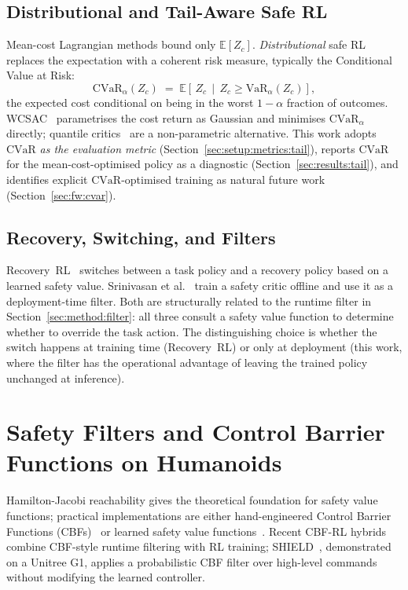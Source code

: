 \documentclass[11pt,a4paper]{report}
\newcommand{\cvar}{\ensuremath{\mathrm{CVaR}}}
\begin{document}
\subsection{Distributional and Tail-Aware Safe RL}
\label{sec:bg:safe:distr}

Mean-cost Lagrangian methods bound only $\mathbb{E}[Z_c]$.
\emph{Distributional} safe RL replaces the expectation with a
coherent risk measure, typically the Conditional Value at Risk:
\begin{equation}
  \cvar_{\alpha}(Z_c) \;=\;
  \mathbb{E}\!\left[\, Z_c \,\middle|\, Z_c \ge \mathrm{VaR}_{\alpha}(Z_c) \right],
  \label{eq:cvar-def}
\end{equation}
the expected cost conditional on being in the worst $1-\alpha$
fraction of outcomes. WCSAC~\cite{yang2021wcsac} parametrises the
cost return as Gaussian and minimises $\cvar_{\alpha}$ directly;
quantile critics~\cite{dabney2018qrdqn} are a non-parametric
alternative. This work adopts \cvar{} \emph{as the evaluation
metric} (Section~\ref{sec:setup:metrics:tail}), reports \cvar{} for
the mean-cost-optimised policy as a diagnostic
(Section~\ref{sec:results:tail}), and identifies explicit
\cvar{}-optimised training as natural future work
(Section~\ref{sec:fw:cvar}).

\subsection{Recovery, Switching, and Filters}
\label{sec:bg:safe:recovery}

Recovery~RL~\cite{thananjeyan2021recovery} switches between a task
policy and a recovery policy based on a learned safety value.
Srinivasan et al.~\cite{srinivasan2020learning} train a safety
critic offline and use it as a deployment-time filter. Both are
structurally related to the runtime filter in
Section~\ref{sec:method:filter}: all three consult a safety value
function to determine whether to override the task action. The
distinguishing choice is whether the switch happens at training
time (Recovery~RL) or only at deployment (this work, where the
filter has the operational advantage of leaving the trained policy
unchanged at inference).

\section{Safety Filters and Control Barrier Functions on Humanoids}
\label{sec:bg:cbf}

Hamilton-Jacobi reachability gives the theoretical foundation for
safety value functions; practical implementations are either
hand-engineered Control Barrier Functions
(CBFs)~\cite{ames2019cbf} or learned safety value
functions~\cite{srinivasan2020learning,thananjeyan2021recovery}.
Recent CBF-RL hybrids~\cite{cbfrl2024} combine CBF-style runtime
filtering with RL training; SHIELD~\cite{shield2025}, demonstrated
on a Unitree G1, applies a probabilistic CBF filter over high-level
commands without modifying the learned controller.
\end{document}
